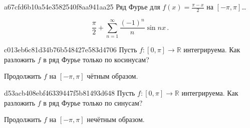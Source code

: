 \begin{note}{a67cfd6b10a54e3582540f8aa941aa25}
    Ряд Фурье для \({ f(x) = \frac{\pi - x}{2} }\) на \({ [-\pi, \pi] }\)\ldots

    \begin{cloze}{1}
        \[
            \frac{\pi}{2} + \sum_{n=1}^{\infty} \frac{(-1)^{n}}{n} \sin nx\,.
        \]
    \end{cloze}
\end{note}

\begin{note}{c013eb6c81d34b76b548427e583d4706}
    Пусть \({ f : [0, \pi] \to \mathbb R }\) интегрируема.
    Как разложить \({ f }\) в ряд Фурье только по косинусам?

    \begin{cloze}{1}
        Продолжить \({ f }\) на \({ [-\pi, \pi] }\) чётным образом.
    \end{cloze}
\end{note}

\begin{note}{d53acb408ebf46339447f5b81493d648}
    Пусть \({ f : [0, \pi] \to \mathbb R }\) интегрируема.
    Как разложить \({ f }\) в ряд Фурье только по синусам?

    \begin{cloze}{1}
        Продолжить \({ f }\) на \({ [-\pi, \pi] }\) нечётным образом.
    \end{cloze}
\end{note}


